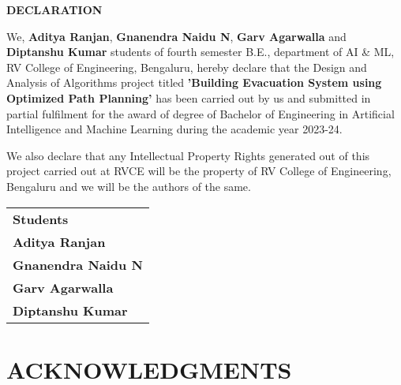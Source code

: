 \documentclass[11pt,a4paper]{report}
\begin{document}

\newpage

\begin{center}
\vspace{0.5cm}
\textbf{\Large DECLARATION}
\end{center}

\vspace{1cm}

We,
\textbf{Aditya Ranjan},
\textbf{Gnanendra Naidu N},
\textbf{Garv Agarwalla} and
\textbf{Diptanshu Kumar} students of fourth semester B.E., department of AI \& ML, RV College of Engineering, Bengaluru, hereby declare that the Design and Analysis of Algorithms project titled \textbf{'Building Evacuation System using Optimized Path Planning'} has been carried out by us and submitted in partial fulfilment for the award of degree of Bachelor of Engineering in Artificial Intelligence and Machine Learning during the academic year 2023-24.

\vspace{0.5cm}

We also declare that any Intellectual Property Rights generated out of this project carried out at RVCE will be the property of RV College of Engineering, Bengaluru and we will be the authors of the same.

\vspace{2cm}

\begin{center}
\begin{tabular}{p{6cm}}
\textbf{Students} \\
\textbf{Aditya Ranjan} \\
\textbf{Gnanendra Naidu N} \\
\textbf{Garv Agarwalla} \\
\textbf{Diptanshu Kumar} \\
\end{tabular}
\end{center}

\newpage

\vspace{0.3cm}
\tableofcontents

\vspace{0.3cm}
\chapter*{ACKNOWLEDGMENTS}
\end{document}
